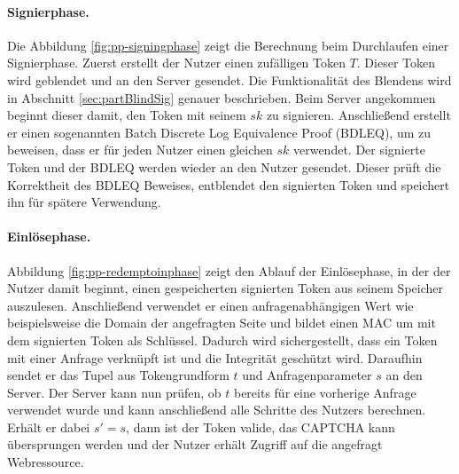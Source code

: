 \documentclass[
	fontsize=11pt,
	headings=small,
	parskip=half,           %
	bibliography=totoc,
	numbers=noenddot,       %
	open=any,               %
]{scrreprt}
\begin{document}
\paragraph{Signierphase.}
Die Abbildung \ref{fig:pp-signingphase} zeigt die Berechnung beim Durchlaufen einer Signierphase. Zuerst erstellt der Nutzer einen zufälligen Token $T$. Dieser Token wird geblendet und an den Server gesendet. Die Funktionalität des Blendens wird in Abschnitt \ref{sec:partBlindSig} genauer beschrieben. Beim Server angekommen beginnt dieser damit, den Token mit seinem $sk$ zu signieren. Anschließend erstellt er einen sogenannten Batch Discrete Log Equivalence Proof (BDLEQ), um zu beweisen, dass er für jeden Nutzer einen gleichen $sk$ verwendet. Der signierte Token und der BDLEQ werden wieder an den Nutzer gesendet. Dieser prüft die Korrektheit des BDLEQ Beweises, entblendet den signierten Token und speichert ihn für spätere Verwendung. 

\paragraph{Einlösephase.}
Abbildung \ref{fig:pp-redemptoinphase} zeigt den Ablauf der Einlösephase, in der der Nutzer damit beginnt, einen gespeicherten signierten Token aus seinem Speicher auszulesen. Anschließend verwendet er einen anfragenabhängigen Wert wie beispielsweise die Domain der angefragten Seite und bildet einen MAC um mit dem signierten Token als Schlüssel. Dadurch wird sichergestellt, dass ein Token mit einer Anfrage verknüpft ist und die Integrität geschützt wird. Daraufhin sendet er das Tupel aus Tokengrundform $t$ und Anfragenparameter $s$ an den Server. Der Server kann nun prüfen, ob $t$ bereits für eine vorherige Anfrage verwendet wurde und kann anschließend alle Schritte des Nutzers berechnen. Erhält er dabei $s'=s$, dann ist der Token valide, das CAPTCHA kann übersprungen werden und der Nutzer erhält Zugriff auf die angefragt Webressource.
\end{document}
